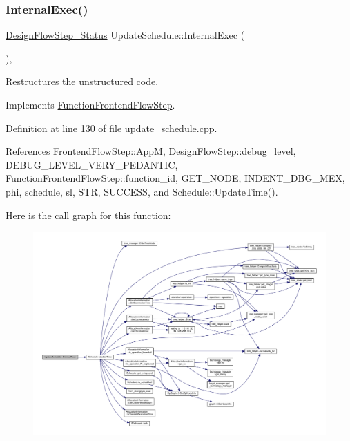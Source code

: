 \mbox{\label{classUpdateSchedule_aae8f0a93b502c3bb5c568e164b48e504}} 
\subsubsection{\texorpdfstring{Internal\+Exec()}{InternalExec()}}
{\footnotesize\ttfamily \hyperlink{design__flow__step_8hpp_afb1f0d73069c26076b8d31dbc8ebecdf}{Design\+Flow\+Step\+\_\+\+Status} Update\+Schedule\+::\+Internal\+Exec (\begin{DoxyParamCaption}{ }\end{DoxyParamCaption})\hspace{0.3cm}{\ttfamily [override]}, {\ttfamily [virtual]}}



Restructures the unstructured code. 



Implements \hyperlink{classFunctionFrontendFlowStep_a00612f7fb9eabbbc8ee7e39d34e5ac68}{Function\+Frontend\+Flow\+Step}.



Definition at line 130 of file update\+\_\+schedule.\+cpp.



References Frontend\+Flow\+Step\+::\+AppM, Design\+Flow\+Step\+::debug\+\_\+level, D\+E\+B\+U\+G\+\_\+\+L\+E\+V\+E\+L\+\_\+\+V\+E\+R\+Y\+\_\+\+P\+E\+D\+A\+N\+T\+IC, Function\+Frontend\+Flow\+Step\+::function\+\_\+id, G\+E\+T\+\_\+\+N\+O\+DE, I\+N\+D\+E\+N\+T\+\_\+\+D\+B\+G\+\_\+\+M\+EX, phi, schedule, sl, S\+TR, S\+U\+C\+C\+E\+SS, and Schedule\+::\+Update\+Time().

Here is the call graph for this function\+:
\nopagebreak
\begin{figure}[H]
\begin{center}
\leavevmode
\includegraphics[width=350pt]{d2/de3/classUpdateSchedule_aae8f0a93b502c3bb5c568e164b48e504_cgraph}
\end{center}
\end{figure}



